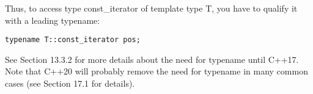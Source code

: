 Thus, to access type const\_iterator of template type T, you have to qualify it with a leading typename:

\begin{lstlisting}[style=styleCXX]
typename T::const_iterator pos;
\end{lstlisting}

See Section 13.3.2 for more details about the need for typename until C++17. Note that C++20 will probably remove the need for typename in many common cases (see Section 17.1 for details).











